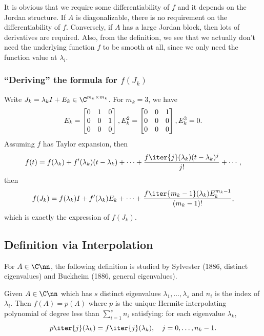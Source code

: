 \documentclass{article}
\begin{document}
It is obvious that we require some differentiability of $f$ and it
depends on the Jordan structure. If $A$ is diagonalizable, there is no
requirement on the differentiability of $f$. Conversely, if $A$ has a
large Jordan block, then lots of derivatives are required. Also, from
the definition, we see that we actually don't need the underlying
function $f$ to be smooth at all, since we only need the function value
at $\lambda_i$.

\subsubsection{``Deriving'' the formula for $f(J_k)$}
Write $J_k = \lambda_k I + E_k \in \C^{m_k \times m_k}$. For $m_k = 3$,
we have 
\begin{equation}\notag
    E_k = 
    \begin{bmatrix}
        0 & 1 & 0 \\ 0 & 0 & 1 \\ 0 & 0 & 0
    \end{bmatrix},
    E_k^2 = 
    \begin{bmatrix}
        0 & 0 & 1 \\ 0 & 0 & 0 \\ 0 & 0 & 0 
    \end{bmatrix},
    E_k^3 = 0.
\end{equation}
Assuming $f$ has Taylor expansion, then 
\begin{equation}\notag
    f(t) = f(\lambda_k) + f'(\lambda_k)(t-\lambda_k) + \cdots + \frac{f\iter{j}(\lambda_k)(t-\lambda_k)^j}{j!} + \cdots,
\end{equation}
then 
\begin{equation}\notag
    f(J_k) = f(\lambda_k)I + f'(\lambda_k)E_k + \cdots + \frac{f\iter{m_k - 1}(\lambda_k)E_k^{m_k - 1}}{(m_k - 1)!},
\end{equation}
which is exactly the expression of $f(J_k)$.

\subsection{Definition via Interpolation}
For $A\in\C\nn$, the following definition is studied by Sylvester (1886,
distinct eigenvalues) and Buckheim (1886, general eigenvalues).
\begin{definition}
     Given $A\in\C\nn$ which has $s$
    distinct eigenvalues $\lambda_1,\dots,\lambda_s$ and $n_i$ is the
    index of $\lambda_i$. Then $f(A) = p(A)$ where $p$ is the unique
    Hermite interpolating polynomial of degree less than $\sum_{i = 1}^s
    n_i$ satisfying: for each eigenvalue $\lambda_k$, 
    \begin{equation}\notag
        p\iter{j}(\lambda_k) = f\iter{j}(\lambda_k),\quad j = 0,\dots,n_k - 1.
    \end{equation}
\end{definition}
\end{document}
